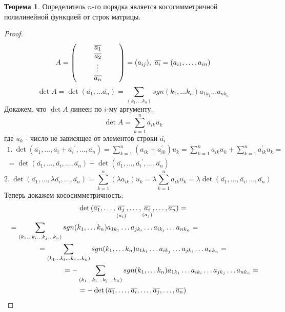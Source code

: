 \documentclass[a4paper, 12pt]{article}
\newcommand\tab[1][.5cm]{\hspace*{#1}}
\newcounter{thcount}
\theoremstyle{definition}
\newtheorem{theoremnum}[thcount]{Теорема}
\begin{document}
  \begin{theoremnum}
    Определитель $n$-го порядка является кососимметричной полилинейной функцией от строк матрицы.    
  \end{theoremnum} 
  \begin{proof}
    $$A=\begin{pmatrix}
      \tab & \overline{a_1} & \tab\\
      \null & \overline{a_2} & \null\\
      \null & \vdots & \null\\
      \null & \overline{a_n} & \null
    \end{pmatrix}=(a_{ij}),\ \overline{a_i}=(a_{i1},\dots, a_{in})$$
    $$\det{A}=\det{(\overline{a_1},\dots \overline{a_n})}=\sum\limits_{(k_1,\dots k_n)}sgn(k_1,\dots k_n)a_{1k_1}\dots a_{nk_n}$$
    Докажем, что $\det{A}$ линеен по $i$-му аргументу.
    $$\det{A}=\sum\limits_{k=1}^na_{ik}u_k$$
    где $u_k$ - число не зависящее от элементов строки $\overline{a_i}$
    \begin{multline*}
      1.\ \det(\overline{a_1},\dots,\overline{a_i}+{\overline{a_i}}^{\prime},\dots, \overline{a_n})=\sum\limits_{k=1}^n(a_{ik}+a_{ik}^{\prime})u_k=\sum\limits_{k=1}^na_{ik}u_k+\sum\limits_{k=1}^na_{ik}^{\prime}u_k=\\=\det{(\overline{a_1},\dots,\overline{a_i},\dots, \overline{a_n})}+\det{(\overline{a_1},\dots,\overline{a_i}^{\prime},\dots, \overline{a_n})}
    \end{multline*}
    $$2.\ \det{(\overline{a_1},\dots,\lambda\overline{a_i},\dots, \overline{a_n})}=\sum\limits_{k=1}^n(\lambda a_{ik})u_k=\lambda\sum\limits_{k=1}^na_{ik}u_k=\lambda\det{(\overline{a_1},\dots,\overline{a_i},\dots, \overline{a_n})}$$
    Теперь докажем кососимметричность:
    \begin{multline*}
    \det{(\overline{a_1},\dots,\underset{(a_i)}{\overline{a_j}},\dots,\underset{(a_j)}{\overline{a_i}},\dots,\overline{a_n})}=\\ \tab[-2.8cm]=\sum\limits_{(k_1\dots k_i\dots k_j\dots k_n)}sgn(k_1,\dots k_n)a_{1k_1}\dots a_{jk_i}\dots a_{ik_j}\dots a_{nk_n}=\\=\sum\limits_{(k_1\dots k_i\dots k_j\dots k_n)}sgn(k_1,\dots k_n)a_{1k_1}\dots a_{ik_j}\dots a_{jk_i}\dots a_{nk_n}=\\=-\sum\limits_{(k_1\dots k_i\dots k_j\dots k_n)}sgn(k_1,\dots k_n)a_{1k_1}\dots a_{ik_i}\dots a_{jk_j}\dots a_{nk_n}=\tab[-2.8cm]\\=-\det{(\overline{a_1},\dots,\overline{a_i},\dots,\overline{a_j},\dots,\overline{a_n})}
    \end{multline*}
  \end{proof} 
\end{document}
